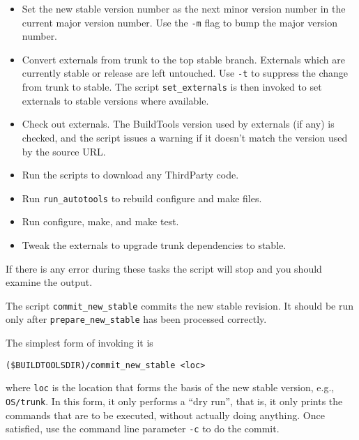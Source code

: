 \begin{itemize}
  \item Set the new stable version number as the next minor version number in
    the current major version number. Use the {\tt -m} flag to bump the major
    version number.

  \item Convert externals from trunk to the top stable branch. Externals which
    are currently stable or release are left untouched. Use {\tt -t} to suppress
    the change from trunk to stable. The script {\tt set\_externals} is then invoked to set
    externals to stable versions where available.

  \item Check out externals. The BuildTools version used by externals (if any)
    is checked, and the script issues a warning if it doesn't match the
    version used by the source URL.

 \item Run the scripts to download any ThirdParty code.

  \item Run {\tt run\_autotools} to rebuild configure and make files.

  \item Run configure, make, and make test.

  \item Tweak the externals to upgrade trunk  dependencies to stable.
\end{itemize}

If there is any error during these tasks the script will stop and you should
examine the output.
   
\medskip

The script {\tt commit\_new\_stable} commits the new stable revision. It should be run only after 
{\tt prepare\_new\_stable} has been processed correctly.  

The simplest form of invoking it is

\begin{verbatim}
($BUILDTOOLSDIR)/commit_new_stable <loc>
\end{verbatim}

\noindent
where {\tt loc} is the location that forms the basis of the new stable version, e.g., {\tt OS/trunk}. In this form, it only performs a ``dry run'', that is, it only prints the commands that are to be executed, without actually doing anything. Once satisfied, use the command line parameter {\tt -c} to do the commit.

